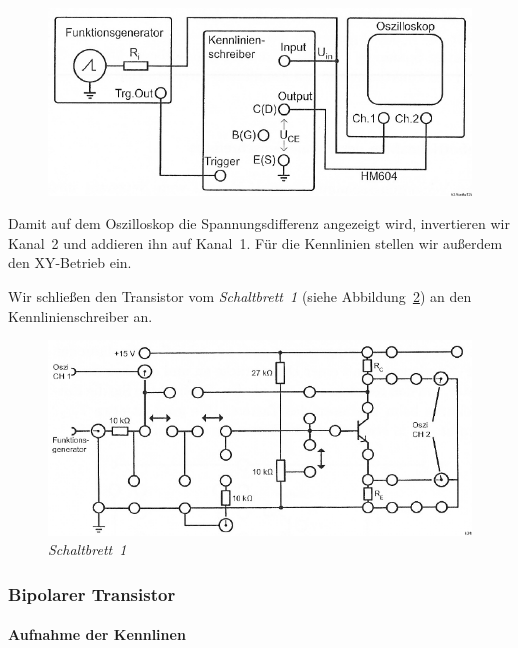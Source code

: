 \begin{figure}[htbp]
	\centering
	\includegraphics[width=\textwidth]{Anleitung/3-2.png}
	\caption{
		\cite[Abbildung~3.2]{physik313-Anleitung}
	}
	\label{fig:3-2}
\end{figure}

Damit auf dem Oszilloskop die Spannungsdifferenz angezeigt wird, invertieren
wir Kanal~2 und addieren ihn auf Kanal~1. Für die Kennlinien stellen wir
außerdem den XY-Betrieb ein.

Wir schließen den Transistor vom \emph{Schaltbrett~1} (siehe
Abbildung~\ref{fig:3-4}) an den Kennlinienschreiber an.

\begin{figure}[htbp]
	\centering
	\includegraphics[width=\textwidth]{Anleitung/3-4.png}
	\caption{
		\emph{Schaltbrett~1} \cite[Abbildung~3.4]{physik313-Anleitung}
	}
	\label{fig:3-4}
\end{figure}

\FloatBarrier
\subsubsection{Bipolarer Transistor}

\paragraph{Aufnahme der Kennlinen}

